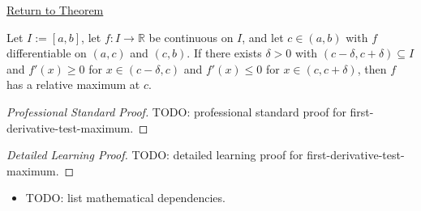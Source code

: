 \newpage
{}
\label{prf:first-derivative-test-maximum}

\begin{remark*}[Return]
\hyperref[thm:first-derivative-test-maximum]{Return to Theorem}
\end{remark*}

\begin{theorem*}
Let $I := [a,b]$, let $f : I \to \mathbb{R}$ be continuous on $I$, and let $c \in (a,b)$ with $f$ differentiable on $(a,c)$ and $(c,b)$. If there exists $\delta > 0$ with $(c-\delta,c+\delta) \subseteq I$ and $f'(x) \geq 0$ for $x \in (c-\delta,c)$ and $f'(x) \leq 0$ for $x \in (c,c+\delta)$, then $f$ has a relative maximum at $c$.
\end{theorem*}

\begin{proof}[Professional Standard Proof]
\LRAProofBodyStart
TODO: professional standard proof for first-derivative-test-maximum.
\end{proof}

\begin{proof}[Detailed Learning Proof]
\LRAProofBodyStart
TODO: detailed learning proof for first-derivative-test-maximum.
\end{proof}

\begin{remark*}
\end{remark*}

\begin{dependencies}
\begin{itemize}
  \item TODO: list mathematical dependencies.
\end{itemize}
\end{dependencies}

\clearpage
